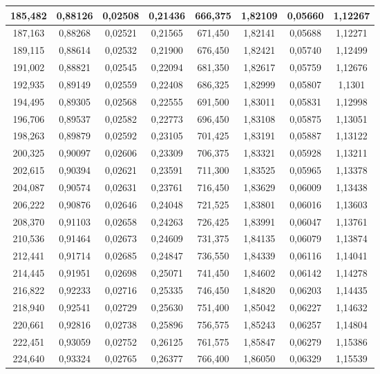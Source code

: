 \documentclass[a4paper,12pt]{article}
\numberwithin{equation}{section}
\begin{document}
\begin{appendices}
\begin{longtable}[c]{|c|c|c|c|c|c|c|c|}
185,482	&	0,88126	&	0,02508	&	0,21436	&	666,375	&	1,82109	&	0,05660	&	1,12267	\\\hline
187,163	&	0,88268	&	0,02521	&	0,21565	&	671,450	&	1,82141	&	0,05688	&	1,12271	\\\hline
189,115	&	0,88614	&	0,02532	&	0,21900	&	676,450	&	1,82421	&	0,05740	&	1,12499	\\\hline
191,002	&	0,88821	&	0,02545	&	0,22094	&	681,350	&	1,82617	&	0,05759	&	1,12676	\\\hline
192,935	&	0,89149	&	0,02559	&	0,22408	&	686,325	&	1,82999	&	0,05807	&	1,1301	\\\hline
194,495	&	0,89305	&	0,02568	&	0,22555	&	691,500	&	1,83011	&	0,05831	&	1,12998	\\\hline
196,706	&	0,89537	&	0,02582	&	0,22773	&	696,450	&	1,83108	&	0,05875	&	1,13051	\\\hline
198,263	&	0,89879	&	0,02592	&	0,23105	&	701,425	&	1,83191	&	0,05887	&	1,13122	\\\hline
200,325	&	0,90097	&	0,02606	&	0,23309	&	706,375	&	1,83321	&	0,05928	&	1,13211	\\\hline
202,615	&	0,90394	&	0,02621	&	0,23591	&	711,300	&	1,83525	&	0,05965	&	1,13378	\\\hline
204,087	&	0,90574	&	0,02631	&	0,23761	&	716,450	&	1,83629	&	0,06009	&	1,13438	\\\hline
206,222	&	0,90876	&	0,02646	&	0,24048	&	721,525	&	1,83801	&	0,06016	&	1,13603	\\\hline
208,370	&	0,91103	&	0,02658	&	0,24263	&	726,425	&	1,83991	&	0,06047	&	1,13761	\\\hline
210,536	&	0,91464	&	0,02673	&	0,24609	&	731,375	&	1,84135	&	0,06079	&	1,13874	\\\hline
212,441	&	0,91714	&	0,02685	&	0,24847	&	736,550	&	1,84339	&	0,06116	&	1,14041	\\\hline
214,445	&	0,91951	&	0,02698	&	0,25071	&	741,450	&	1,84602	&	0,06142	&	1,14278	\\\hline
216,822	&	0,92233	&	0,02716	&	0,25335	&	746,450	&	1,84820	&	0,06203	&	1,14435	\\\hline
218,940	&	0,92541	&	0,02729	&	0,25630	&	751,400	&	1,85042	&	0,06227	&	1,14632	\\\hline
220,661	&	0,92816	&	0,02738	&	0,25896	&	756,575	&	1,85243	&	0,06257	&	1,14804	\\\hline
222,451	&	0,93059	&	0,02752	&	0,26125	&	761,575	&	1,85847	&	0,06279	&	1,15386	\\\hline
224,640	&	0,93324	&	0,02765	&	0,26377	&	766,400	&	1,86050	&	0,06329	&	1,15539	\\\hline

\end{longtable}
\end{appendices}
\end{document}
